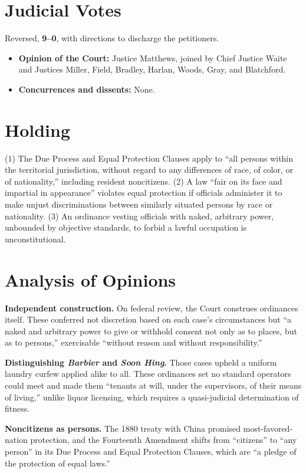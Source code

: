 \documentclass[12pt]{article}
\begin{document}
\section{Judicial Votes}

Reversed, \textbf{9--0}, with directions to discharge the petitioners.
\begin{itemize}
\item \textbf{Opinion of the Court:} Justice Matthews, joined by Chief Justice Waite and Justices Miller, Field, Bradley, Harlan, Woods, Gray, and Blatchford.
\item \textbf{Concurrences and dissents:} None.
\end{itemize}

\section{Holding}

(1) The Due Process and Equal Protection Clauses apply to ``all persons within the territorial jurisdiction, without regard to any differences of race, of color, or of nationality,'' including resident noncitizens. (2) A law ``fair on its face and impartial in appearance'' violates equal protection if officials administer it to make unjust discriminations between similarly situated persons by race or nationality. (3) An ordinance vesting officials with naked, arbitrary power, unbounded by objective standards, to forbid a lawful occupation is unconstitutional.

\section{Analysis of Opinions}

\textbf{Independent construction.} On federal review, the Court construes ordinances itself. These conferred not discretion based on each case's circumstances but ``a naked and arbitrary power to give or withhold consent not only as to places, but as to persons,'' exercisable ``without reason and without responsibility.''

\textbf{Distinguishing \textit{Barbier} and \textit{Soon Hing}.} Those cases upheld a uniform laundry curfew applied alike to all. These ordinances set no standard operators could meet and made them ``tenants at will, under the supervisors, of their means of living,'' unlike liquor licensing, which requires a quasi-judicial determination of fitness.

\textbf{Noncitizens as persons.} The 1880 treaty with China promised most-favored-nation protection, and the Fourteenth Amendment shifts from ``citizens'' to ``any person'' in its Due Process and Equal Protection Clauses, which are ``a pledge of the protection of equal laws.''
\end{document}
